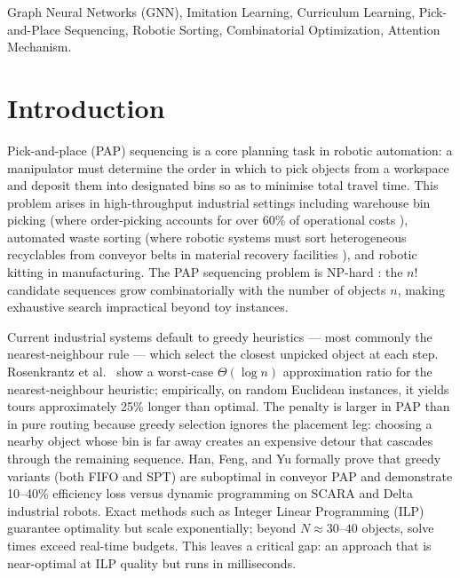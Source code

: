 \documentclass[conference]{IEEEtran}
\begin{document}
\begin{IEEEkeywords}
Graph Neural Networks (GNN), Imitation Learning, Curriculum Learning, Pick-and-Place Sequencing, Robotic Sorting, Combinatorial Optimization, Attention Mechanism.
\end{IEEEkeywords}

\section{Introduction}

Pick-and-place (PAP) sequencing is a core planning task in robotic automation: a manipulator must determine the order in which to pick objects from a workspace and deposit them into designated bins so as to minimise total travel time. This problem arises in high-throughput industrial settings including warehouse bin picking (where order-picking accounts for over 60\% of operational costs \cite{cheng2024drl}), automated waste sorting (where robotic systems must sort heterogeneous recyclables from conveyor belts in material recovery facilities \cite{gundupalli2020sequence}), and robotic kitting in manufacturing. The PAP sequencing problem is NP-hard \cite{chalasani1996}: the $n!$ candidate sequences grow combinatorially with the number of objects $n$, making exhaustive search impractical beyond toy instances.

Current industrial systems default to greedy heuristics --- most commonly the nearest-neighbour rule --- which select the closest unpicked object at each step. Rosenkrantz et al.\ \cite{rosenkrantz1977} show a worst-case $\Theta(\log n)$ approximation ratio for the nearest-neighbour heuristic; empirically, on random Euclidean instances, it yields tours approximately 25\% longer than optimal. The penalty is larger in PAP than in pure routing because greedy selection ignores the placement leg: choosing a nearby object whose bin is far away creates an expensive detour that cascades through the remaining sequence. Han, Feng, and Yu \cite{han2019pap} formally prove that greedy variants (both FIFO and SPT) are suboptimal in conveyor PAP and demonstrate 10--40\% efficiency loss versus dynamic programming on SCARA and Delta industrial robots. Exact methods such as Integer Linear Programming (ILP) guarantee optimality but scale exponentially; beyond $N \approx 30$--$40$ objects, solve times exceed real-time budgets. This leaves a critical gap: an approach that is near-optimal at ILP quality but runs in milliseconds.
\end{document}
